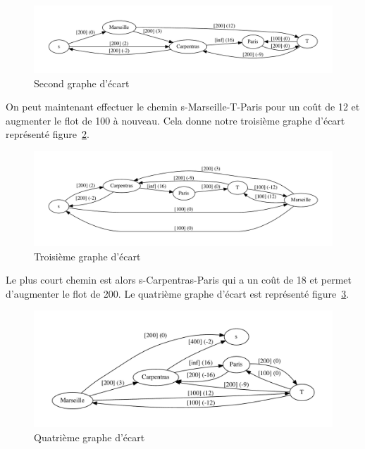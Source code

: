 \documentclass[paper=a4, fontsize=11pt]{scrartcl} %
\numberwithin{equation}{section} %
\numberwithin{figure}{section} %
\numberwithin{table}{section} %
\begin{document}
\begin{figure}[ht]
\begin{center}
	\includegraphics[width=\textwidth]{fleurs-3.pdf}
	\caption{Second graphe d'écart}
	\label{fig:fleurs:trois}
\end{center}
\end{figure}

On peut maintenant effectuer le chemin s-Marseille-T-Paris pour un coût de 12 et augmenter le flot de 100 à nouveau. Cela donne notre troisième graphe d'écart représenté figure~\ref{fig:fleurs:quatre}.

\begin{figure}[htbp]
\begin{center}
	\includegraphics[width=\textwidth]{fleurs-4.pdf}
	\caption{Troisième graphe d'écart}
	\label{fig:fleurs:quatre}
\end{center}
\end{figure}

Le plus court chemin est alors s-Carpentras-Paris qui a un coût de 18 et permet d'augmenter le flot de 200. Le quatrième graphe d'écart est représenté figure~\ref{fig:fleurs:cinq}.

\begin{figure}[h]
\begin{center}
	\includegraphics[width=\textwidth]{fleurs-5.pdf}
	\caption{Quatrième graphe d'écart}
	\label{fig:fleurs:cinq}
\end{center}
\end{figure}
\end{document}
